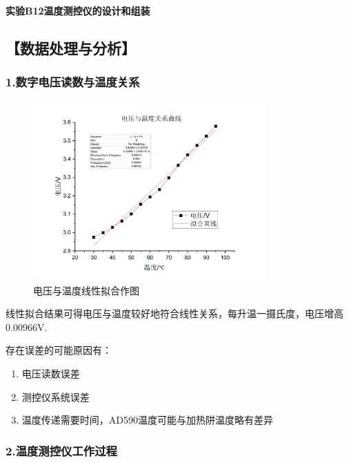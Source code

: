 \documentclass[12pt,a4paper,UTF8]{ctexart}
\begin{document}

\begin{center}
\LARGE\textbf{实验B12温度测控仪的设计和组装}
\end{center}




\subsection*{【数据处理与分析】}
\subsubsection*{1.数字电压读数与温度关系}

\begin{figure}[htbp]
	\centering
	\includegraphics[width=0.8\textwidth]{img//reg.png}
	\caption{电压与温度线性拟合作图}
\end{figure}
线性拟合结果可得电压与温度较好地符合线性关系，每升温一摄氏度，电压增高0.00966V.

存在误差的可能原因有：
\begin{enumerate}
	\item 电压读数误差
	\item 测控仪系统误差
	\item 温度传递需要时间，AD590温度可能与加热阱温度略有差异
\end{enumerate}

\subsubsection*{2.温度测控仪工作过程}
\end{document}
